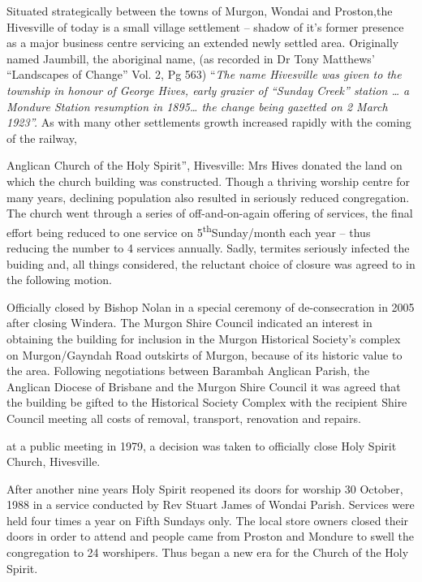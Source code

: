 Situated strategically between the towns of Murgon, Wondai and Proston,the Hivesville of today is a small village settlement -- shadow of it's former presence as a major business centre servicing an extended newly settled area. Originally named Jaumbill, the aboriginal name, (as recorded in Dr Tony Matthews' ``Landscapes of Change'' Vol. 2, Pg 563) ``\emph{The name Hivesville was given to the township in honour of George Hives, early grazier of ``Sunday Creek'' station \ldots{} a Mondure Station resumption in 1895\ldots{} the change being gazetted on 2 March 1923''.} As with many other settlements growth increased rapidly with the coming of the railway,



Anglican Church of the Holy Spirit'', Hivesville: Mrs Hives donated the land on which the church building was constructed. Though a thriving worship centre for many years, declining population also resulted in seriously reduced congregation. The church went through a series of off-and-on-again offering of services, the final effort being reduced to one service on 5\textsuperscript{th}Sunday/month each year -- thus reducing the number to 4 services annually. Sadly, termites seriously infected the buiding and, all things considered, the reluctant choice of closure was agreed to in the following motion.



Officially closed by Bishop Nolan in a special ceremony of de-consecration in 2005 after closing Windera. The Murgon Shire Council indicated an interest in obtaining the building for inclusion in the Murgon Historical Society's complex on Murgon/Gayndah Road outskirts of Murgon, because of its historic value to the area. Following negotiations between Barambah Anglican Parish, the Anglican Diocese of Brisbane and the Murgon Shire Council it was agreed that the building be gifted to the Historical Society Complex with the recipient Shire Council meeting all costs of removal, transport, renovation and repairs.



at a public meeting in 1979, a decision was taken to officially close Holy Spirit Church, Hivesville.



After another nine years Holy Spirit reopened its doors for worship 30 October, 1988 in a service conducted by Rev Stuart James of Wondai Parish. Services were held four times a year on Fifth Sundays only. The local store owners closed their doors in order to attend and people came from Proston and Mondure to swell the congregation to 24 worshipers. Thus began a new era for the Church of the Holy Spirit.



